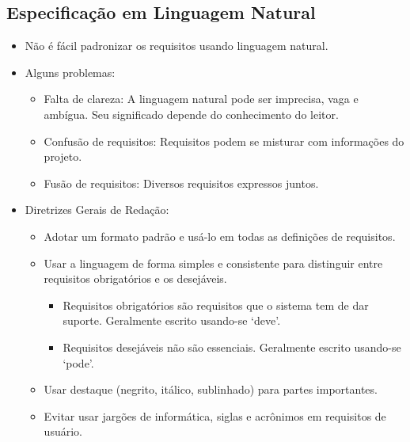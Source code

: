 \documentclass[a4paper, 11pt]{article}
\begin{document}
\subsection{Especificação em Linguagem Natural}
\begin{itemize}
    \item Não é fácil padronizar os requisitos usando linguagem natural.
    \item Alguns problemas:
    \begin{itemize}
        \item Falta de clareza: A linguagem natural pode ser imprecisa, vaga e ambígua. Seu significado depende do conhecimento do leitor.
        \item Confusão de requisitos: Requisitos podem se misturar com informações do projeto.
        \item Fusão de requisitos: Diversos requisitos expressos juntos.
    \end{itemize}
    \item Diretrizes Gerais de Redação:
    \begin{itemize}
        \item Adotar um formato padrão e usá-lo em todas as definições de requisitos.
        \item Usar a linguagem de forma simples e consistente para distinguir entre requisitos obrigatórios e os desejáveis.
        \begin{itemize}
            \item Requisitos obrigatórios são requisitos que o sistema tem de dar suporte. Geralmente escrito usando-se `deve'.
            \item Requisitos desejáveis não são essenciais. Geralmente escrito usando-se `pode'.
        \end{itemize}
		\item Usar destaque (negrito, itálico, sublinhado) para partes importantes.
		\item Evitar usar jargões de informática, siglas e acrônimos em requisitos de usuário.
    \end{itemize}
\end{itemize}
\end{document}
